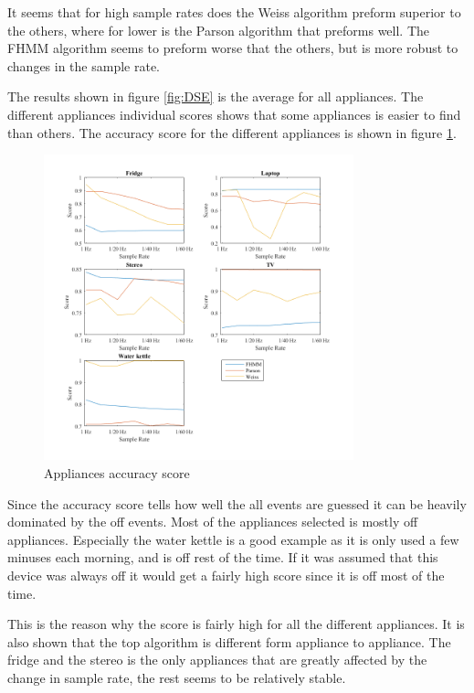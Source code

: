 It seems that for high sample rates does the Weiss algorithm preform superior to the others, where for lower is the Parson algorithm that preforms well. The FHMM algorithm seems to preform worse that the others, but is more robust to changes in the sample rate. 

The results shown in figure \ref{fig:DSE} is the average for all appliances. The different appliances individual scores shows that some appliances is easier to find than others. The accuracy score for the different appliances is shown in figure \ref{fig:AccGS}. 

\begin{figure}[H]
\centering
\includegraphics[width=0.8\textwidth]{billeder/App-AccuracyScore.png}
\caption{Appliances accuracy score}
\label{fig:AccGS}
\end{figure}

Since the accuracy score tells how well the all events are guessed it can be heavily dominated by the off events. Most of the appliances selected is mostly off appliances. Especially the water kettle is a good example as it is only used a few minuses each morning, and is off rest of the time. If it was assumed that this device was always off it would get a fairly high score since it is off most of the time.  

This is the reason why the score is fairly high for all the different appliances. It is also shown that the top algorithm is different form appliance to appliance. The fridge and the stereo is the only appliances that are greatly affected by the change in sample rate, the rest seems to be  relatively stable.

